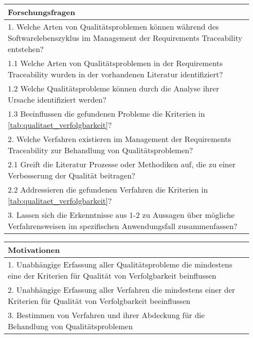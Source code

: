 
\begin{table*}[t]
\renewcommand{\arraystretch}{1.3}
\centering
\begin{tabularx}{\textwidth}{@{}X@{}}
\toprule
Forschungsfragen \\ \midrule
1. Welche Arten von Qualitätsproblemen können während des Softwarelebenszyklus im Management der Requirements Traceability entstehen? \\
\hspace*{10mm}1.1 Welche Arten von Qualitätsproblemen in der Requirements Traceability wurden in der vorhandenen Literatur identifiziert? \\
\hspace*{10mm}1.2 Welche Qualitätsprobleme können durch die Analyse ihrer Ursache identifiziert werden? \\
\hspace*{10mm}1.3 Beeinflussen die gefundenen Probleme die Kriterien in \ref{tab:qualitaet_verfolgbarkeit}? \\
2. Welche Verfahren existieren im Management der Requirements Traceability zur Behandlung von Qualitätsproblemen? \\
\hspace*{10mm}2.1 Greift die Literatur Prozesse oder Methodiken auf, die zu einer Verbesserung der Qualität beitragen? \\
\hspace*{10mm}2.2 Addressieren die gefundenen Verfahren die Kriterien in \ref{tab:qualitaet_verfolgbarkeit}? \\
3. Lassen sich die Erkenntnisse aus 1-2 zu Aussagen über mögliche Verfahrensweisen im spezifischen Anwendungsfall zusammenfassen? \\
\bottomrule
\end{tabularx}
\caption{Definierte Forschungsfragen}
\label{tab:forschungsfragen}
\end{table*}

\begin{table*}[t]
    \centering
    \begin{tabularx}{\textwidth}{X}
        \toprule
        Motivationen \\ \midrule
        1. Unabhängige Erfassung aller Qualitätsprobleme die mindestens eine der Kriterien für Qualität von Verfolgbarkeit beinflussen \\
        2. Unabhängige Erfassung aller Verfahren die mindestens einer der Kriterien für Qualität von Verfolgbarkeit beeinflussen \\
        3. Bestimmen von Verfahren und ihrer Abdeckung für die Behandlung von Qualitätsproblemen \\
    \bottomrule
    \end{tabularx}
    \caption{Motivationen zu den gestellten Forschungsfragen in \ref{tab:forschungsfragen}}
    \label{tab:motivationen}
\end{table*}


